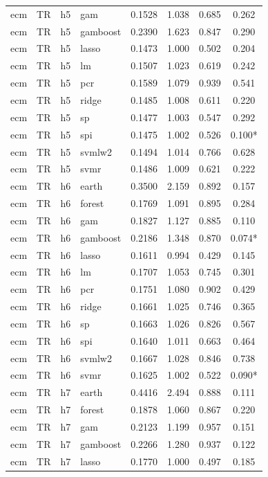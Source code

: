\begin{ThreePartTable}
\begin{longtable}[t]{llclcccc}
ecm & TR & h5 & gam & 0.1528 & 1.038 & 0.685 & 0.262\\
ecm & TR & h5 & gamboost & 0.2390 & 1.623 & 0.847 & 0.290\\
ecm & TR & h5 & lasso & 0.1473 & 1.000 & 0.502 & 0.204\\
ecm & TR & h5 & lm & 0.1507 & 1.023 & 0.619 & 0.242\\
ecm & TR & h5 & pcr & 0.1589 & 1.079 & 0.939 & 0.541\\
ecm & TR & h5 & ridge & 0.1485 & 1.008 & 0.611 & 0.220\\
ecm & TR & h5 & sp & 0.1477 & 1.003 & 0.547 & 0.292\\
ecm & TR & h5 & spi & 0.1475 & 1.002 & 0.526 & 0.100*\\
ecm & TR & h5 & svmlw2 & 0.1494 & 1.014 & 0.766 & 0.628\\
ecm & TR & h5 & svmr & 0.1486 & 1.009 & 0.621 & 0.222\\
\addlinespace
ecm & TR & h6 & earth & 0.3500 & 2.159 & 0.892 & 0.157\\
ecm & TR & h6 & forest & 0.1769 & 1.091 & 0.895 & 0.284\\
ecm & TR & h6 & gam & 0.1827 & 1.127 & 0.885 & 0.110\\
ecm & TR & h6 & gamboost & 0.2186 & 1.348 & 0.870 & 0.074*\\
ecm & TR & h6 & lasso & 0.1611 & 0.994 & 0.429 & 0.145\\
ecm & TR & h6 & lm & 0.1707 & 1.053 & 0.745 & 0.301\\
ecm & TR & h6 & pcr & 0.1751 & 1.080 & 0.902 & 0.429\\
ecm & TR & h6 & ridge & 0.1661 & 1.025 & 0.746 & 0.365\\
ecm & TR & h6 & sp & 0.1663 & 1.026 & 0.826 & 0.567\\
ecm & TR & h6 & spi & 0.1640 & 1.011 & 0.663 & 0.464\\
ecm & TR & h6 & svmlw2 & 0.1667 & 1.028 & 0.846 & 0.738\\
ecm & TR & h6 & svmr & 0.1625 & 1.002 & 0.522 & 0.090*\\
\addlinespace
ecm & TR & h7 & earth & 0.4416 & 2.494 & 0.888 & 0.111\\
ecm & TR & h7 & forest & 0.1878 & 1.060 & 0.867 & 0.220\\
ecm & TR & h7 & gam & 0.2123 & 1.199 & 0.957 & 0.151\\
ecm & TR & h7 & gamboost & 0.2266 & 1.280 & 0.937 & 0.122\\
ecm & TR & h7 & lasso & 0.1770 & 1.000 & 0.497 & 0.185\\

\end{longtable}
\end{ThreePartTable}
